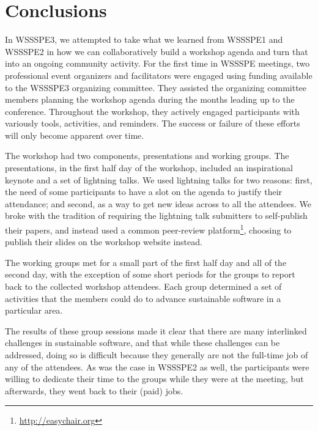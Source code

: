 \documentclass[11pt, oneside]{amsart}
\begin{document}


%









\section{Conclusions} \label{sec:conclusions}

In WSSSPE3, we attempted to take what we learned from WSSSPE1 and WSSSPE2 in how
we can collaboratively build a workshop agenda and turn that into an ongoing
community activity. For the first time in WSSSPE meetings, two professional
event organizers and facilitators were engaged using funding available to the
WSSSPE3 organizing committee. They assisted the organizing committee members
planning the workshop agenda during the months leading up to the conference.
Throughout the workshop, they actively engaged participants with variously
tools, activities, and reminders. The success or failure of these efforts will
only become apparent over time.

The workshop had two components, presentations and working groups. The
presentations, in the first half day of the workshop, included an inspirational
keynote and a set of lightning talks. We used lightning talks for two reasons:
first, the need of some participants to have a slot on the agenda to justify
their attendance; and second, as a way to get new ideas across to all the
attendees. We broke with the tradition of requiring the lightning talk
submitters to self-publish their papers, and instead used a common peer-review
platform\footnote{\url{http://easychair.org}}, choosing to publish their slides
on the workshop website instead.

The working groups met for a small part of the first half day and all of the
second day, with the exception of some short periods for the groups to report
back to the collected workshop attendees. Each group determined a set of
activities that the members could do to advance sustainable software in a
particular area.

The results of these group sessions made it clear that there are many
interlinked challenges in sustainable software, and that while these challenges
can be addressed, doing so is difficult because they generally are not the
full-time job of any of the attendees. As was the case in WSSSPE2 as well, the
participants were willing to dedicate their time to the groups while they were
at the meeting, but afterwards, they went back to their (paid) jobs.
\end{document}
